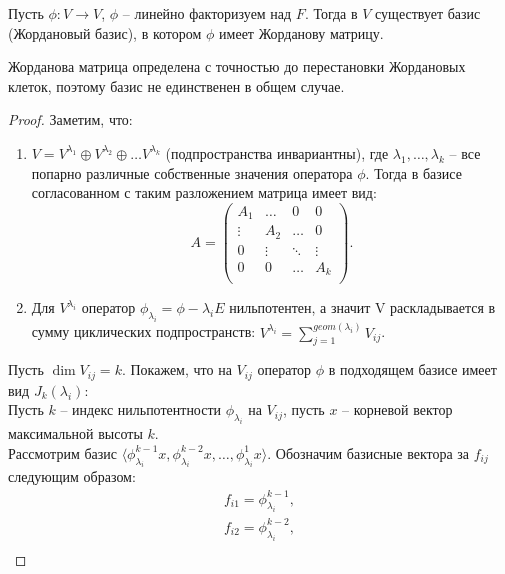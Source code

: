 \begin{theorem}
    Пусть $\phi : V \to V$, $\phi$ -- линейно факторизуем над $F$. 
    Тогда в $V$ существует базис (Жордановый базис), в котором $\phi$ имеет Жорданову матрицу.
\end{theorem}

\begin{note}
    Жорданова матрица определена с точностью до перестановки Жордановых клеток, поэтому базис не единственен в общем случае.
\end{note}

\begin{proof}
    Заметим, что:
    \begin{enumerate}
        \item $V = V^{\lambda_1} \oplus V^{\lambda_2} \oplus \ldots V^{\lambda_k}$ (подпространства инвариантны), где $\lambda_1, \ldots, \lambda_k$ -- все попарно различные собственные значения оператора $\phi$. Тогда в базисе согласованном с таким разложением матрица имеет вид:
         \[A = \begin{pmatrix}
            A_1      & \dots      & 0    & 0 \\
            \vdots      & A_2      & \dots   & 0 \\
            0   & \vdots     & \ddots    & \vdots \\
            0      & 0      & \dots    & A_k \\
            \end{pmatrix}.\]
        \item Для $V^{\lambda_i}$ оператор $\phi_{\lambda_i} = \phi - \lambda_i E$ нильпотентен, а значит V 
        раскладывается в сумму циклических подпространств: $V^{\lambda_i} = \displaystyle\sum_{j = 1}^{geom(\lambda_i)} V_{ij}$.
    \end{enumerate}
    Пусть $\dim V_{ij} = k$. Покажем, что на $V_{ij}$ оператор $\phi$ в подходящем базисе имеет вид $J_k(\lambda_i)$:\\ 
    Пусть $k$ -- индекс нильпотентности $\phi_{\lambda_i}$ на $V_{ij}$, пусть $x$ -- корневой вектор максимальной высоты $k$.\\
    Рассмотрим базис $\langle \phi_{\lambda_i}^{k-1} x, \phi_{\lambda_i}^{k-2} x, \dots, \phi_{\lambda_i}^{1} x \rangle$. 
    Обозначим базисные вектора за $f_{ij}$ следующим образом:
    \begin{gather*}
        f_{i1} = \phi_{\lambda_i}^{k - 1},\\
        f_{i2} = \phi_{\lambda_i}^{k - 2},\\

\end{gather*}
\end{proof}
